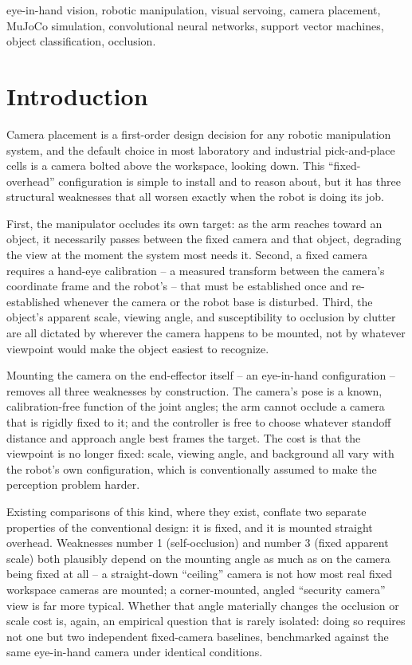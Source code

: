 \documentclass[conference]{IEEEtran}
\begin{document}
\begin{abstract}
direct side effect of fixing the first. Code, data-generation scripts, and trained-model configurations are released for reproduction.
\end{abstract}

\begin{IEEEkeywords}
eye-in-hand vision, robotic manipulation, visual servoing, camera placement, MuJoCo simulation, convolutional neural networks, support vector machines, object classification, occlusion.
\end{IEEEkeywords}

\section{Introduction}

Camera placement is a first-order design decision for any robotic manipulation system, and the default choice in most laboratory and industrial pick-and-place cells is a camera bolted above the workspace, looking down. This ``fixed-overhead'' configuration is simple to install and to reason about, but it has three structural weaknesses that all worsen exactly when the robot is doing its job.

First, the manipulator occludes its own target: as the arm reaches toward an object, it necessarily passes between the fixed camera and that object, degrading the view at the moment the system most needs it. Second, a fixed camera requires a hand-eye calibration -- a measured transform between the camera's coordinate frame and the robot's -- that must be established once and re-established whenever the camera or the robot base is disturbed. Third, the object's apparent scale, viewing angle, and susceptibility to occlusion by clutter are all dictated by wherever the camera happens to be mounted, not by whatever viewpoint would make the object easiest to recognize.

Mounting the camera on the end-effector itself -- an eye-in-hand configuration -- removes all three weaknesses by construction. The camera's pose is a known, calibration-free function of the joint angles; the arm cannot occlude a camera that is rigidly fixed to it; and the controller is free to choose whatever standoff distance and approach angle best frames the target. The cost is that the viewpoint is no longer fixed: scale, viewing angle, and background all vary with the robot's own configuration, which is conventionally assumed to make the perception problem harder.

Existing comparisons of this kind, where they exist, conflate two separate properties of the conventional design: it is fixed, and it is mounted straight overhead. Weaknesses number 1 (self-occlusion) and number 3 (fixed apparent scale) both plausibly depend on the mounting angle as much as on the camera being fixed at all -- a straight-down ``ceiling'' camera is not how most real fixed workspace cameras are mounted; a corner-mounted, angled ``security camera'' view is far more typical. Whether that angle materially changes the occlusion or scale cost is, again, an empirical question that is rarely isolated: doing so requires not one but two independent fixed-camera baselines, benchmarked against the same eye-in-hand camera under identical conditions.
\end{document}
